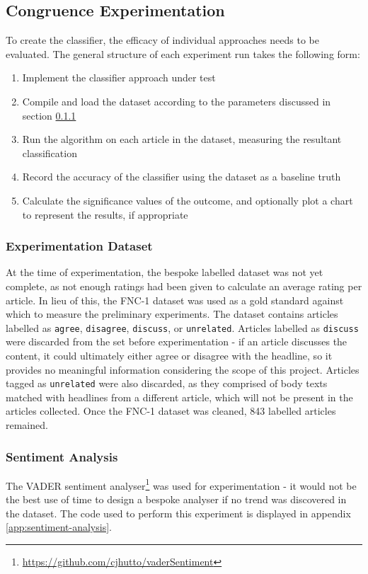 \subsection{Congruence Experimentation}\label{experimentation}
To create the classifier, the efficacy of individual approaches needs to be evaluated. The general structure of each experiment run takes the following form:

\begin{enumerate}
	\item Implement the classifier approach under test
	\item Compile and load the dataset according to the parameters discussed in section \ref{experimentation-data}
	\item Run the algorithm on each article in the dataset, measuring the resultant classification
	\item Record the accuracy of the classifier using the dataset as a baseline truth
	\item Calculate the significance	values of the outcome, and optionally plot a chart to represent the results, if appropriate
\end{enumerate}

\subsubsection{Experimentation Dataset}\label{experimentation-data}
At the time of experimentation, the bespoke labelled dataset was not yet complete, as not enough ratings had been given to calculate an average rating per article. In lieu of this, the FNC-1 dataset was used as a gold standard against which to measure the preliminary experiments. The dataset contains articles labelled as \texttt{agree}, \texttt{disagree}, \texttt{discuss}, or \texttt{unrelated}. Articles labelled as \texttt{discuss} were discarded from the set before experimentation - if an article discusses the content, it could ultimately either agree or disagree with the headline, so it provides no meaningful information considering the scope of this project. Articles tagged as \texttt{unrelated} were also discarded, as they comprised of body texts matched with headlines from a different article, which will not be present in the articles collected. Once the FNC-1 dataset was cleaned, 843 labelled articles remained.


\subsubsection{Sentiment Analysis}
The VADER sentiment analyser\footnote{\url{https://github.com/cjhutto/vaderSentiment}} was used for experimentation - it would not be the best use of time to design a bespoke analyser if no trend was discovered in the dataset. The code used to perform this experiment is displayed in appendix \ref{app:sentiment-analysis}.


